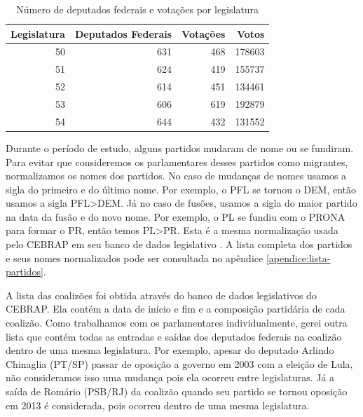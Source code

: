 \documentclass[a4paper,titlepage]{ppgi}\usepackage[]{graphicx}\usepackage[]{color}
\newenvironment{knitrout}{}{} %
\begin{document}
\begin{table}
\centering
\begin{knitrout}
\color{fgcolor}
\begin{tabular}{r|r|r|r}
\hline
Legislatura & Deputados Federais & Votações & Votos\\
\hline
50 & 631 & 468 & 178603\\
\hline
51 & 624 & 419 & 155737\\
\hline
52 & 614 & 451 & 134461\\
\hline
53 & 606 & 619 & 192879\\
\hline
54 & 644 & 432 & 131552\\
\hline
\end{tabular}


\end{knitrout}
\caption{Número de deputados federais e votações por legislatura}
\label{table:estatisticas-legislaturas}
\end{table}

Durante o período de estudo, alguns partidos mudaram de nome ou se fundiram.
Para evitar que consideremos os parlamentares desses partidos como migrantes,
normalizamos os nomes dos partidos. No caso de mudanças de nomes usamos a sigla
do primeiro e do último nome. Por exemplo, o PFL se tornou o DEM, então usamos
a sigla PFL>DEM. Já no caso de fusões, usamos a sigla do maior partido na data
da fusão e do novo nome. Por exemplo, o PL se fundiu com o PRONA para formar o
PR, então temos PL>PR. Esta é a mesma normalização usada pelo \gls{CEBRAP} em
seu banco de dados legislativo \cite{Freitas2008}. A lista completa dos
partidos e seus nomes normalizados pode ser consultada no apêndice
\ref{apendice:lista-partidos}.

A lista das coalizões foi obtida através do banco de dados
legislativos do \gls{CEBRAP}. Ela contém a data de início e fim e a composição
partidária de cada coalizão. Como trabalhamos com os parlamentares
individualmente, gerei outra lista que contém todas as entradas e saídas dos
deputados federais na coalizão dentro de uma mesma legislatura. Por exemplo,
apesar do deputado Arlindo Chinaglia (PT/SP) passar de oposição a governo
em 2003 com a eleição de Lula, não consideramos isso uma mudança pois ela
ocorreu entre legislaturas. Já a saída de Romário (PSB/RJ) da coalizão quando
seu partido se tornou oposição em 2013 é considerada, pois ocorreu dentro de
uma mesma legislatura.
\end{document}
